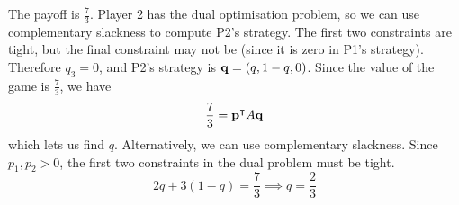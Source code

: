 \begin{example}
    The payoff is \( \frac{7}{3} \).
    Player 2 has the dual optimisation problem, so we can use complementary slackness to compute P2's strategy.
    The first two constraints are tight, but the final constraint may not be (since it is zero in P1's strategy).
    Therefore \( q_3 = 0 \), and P2's strategy is \( \vb q = (q, 1-q, 0) \).
    Since the value of the game is \( \frac{7}{3} \), we have
    \[ \frac{7}{3} = \vb p^\intercal A \vb q \]
    which lets us find \( q \).
    Alternatively, we can use complementary slackness.
    Since \( p_1, p_2 > 0 \), the first two constraints in the dual problem must be tight.
    \[ 2q + 3(1-q) = \frac{7}{3} \implies q = \frac{2}{3} \]
\end{example}
